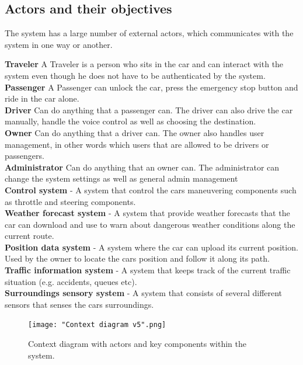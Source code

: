 \documentclass{article}
\begin{document}
\subsection{Actors and their objectives}
The system has a large number of external actors, which communicates with the system in one way or another.
\newline




\noindent
\textbf{Traveler} A Traveler is a person who sits in the car and can interact with the system even though he does not have to be authenticated by the system.\\
\textbf{Passenger} A Passenger can unlock the car, press the emergency stop button and ride in the car alone.\\
\textbf{Driver} Can do anything that a passenger can.
The driver can also drive the car manually, handle the voice control as well as choosing the destination. \\
\textbf{Owner} Can do anything that a driver can. The owner also handles user management, in other words which users that are allowed to be drivers or passengers. \\
\textbf{Administrator} Can do anything that an owner can.
The administrator can change the system settings as well as general admin management \\
\textbf{Control system} - A system that control the cars maneuvering components such as throttle and steering components. \\
\textbf{Weather forecast system} - A system that  provide weather forecasts that the car can download and use to warn about dangerous weather conditions along the current route.  \\
\textbf{Position data system} - A system where the car can upload its current position. Used by the owner to locate the cars position and follow it along its path.  \\
\textbf{Traffic information system} - A system that keeps track of the current traffic situation (e.g. accidents, queues etc). \\
\textbf{Surroundings sensory system} - A system that consists of several different sensors that senses the cars surroundings.  \\

\begin{figure}[htb]    
 \centering
  \texttt{[image: "Context diagram v5".png]}%
  \caption{Context diagram with actors and key components within the system.}
  \label{ContextDiagram}
\end{figure}
\end{document}
